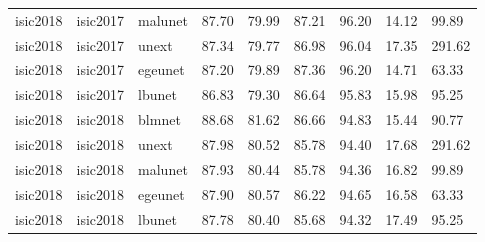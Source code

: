 \begin{tabular}{lllllllll}
isic2018 & isic2017 & malunet & 87.70 & 79.99 & 87.21 & 96.20 & 14.12 & 99.89 \\
isic2018 & isic2017 & unext & 87.34 & 79.77 & 86.98 & 96.04 & 17.35 & 291.62 \\
isic2018 & isic2017 & egeunet & 87.20 & 79.89 & 87.36 & 96.20 & 14.71 & 63.33 \\
isic2018 & isic2017 & lbunet & 86.83 & 79.30 & 86.64 & 95.83 & 15.98 & 95.25 \\
isic2018 & isic2018 & blmnet & 88.68 & 81.62 & 86.66 & 94.83 & 15.44 & 90.77 \\
isic2018 & isic2018 & unext & 87.98 & 80.52 & 85.78 & 94.40 & 17.68 & 291.62 \\
isic2018 & isic2018 & malunet & 87.93 & 80.44 & 85.78 & 94.36 & 16.82 & 99.89 \\
isic2018 & isic2018 & egeunet & 87.90 & 80.57 & 86.22 & 94.65 & 16.58 & 63.33 \\
isic2018 & isic2018 & lbunet & 87.78 & 80.40 & 85.68 & 94.32 & 17.49 & 95.25 \\
\bottomrule
\end{tabular}
